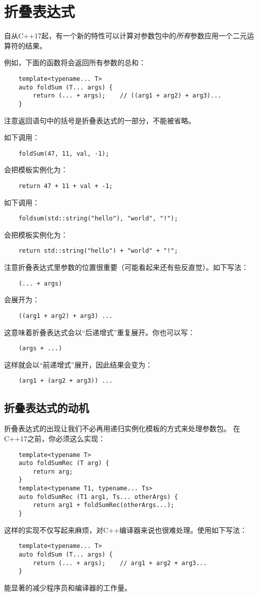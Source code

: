 \chapter{折叠表达式}\label{ch11}
自从C++17起，有一个新的特性可以计算对参数包中的\emph{所有}参数应用一个二元运算符的结果。

例如，下面的函数将会返回所有参数的总和：
\begin{lstlisting}
    template<typename... T>
    auto foldSum (T... args) {
        return (... + args);    // ((arg1 + arg2) + arg3)...
    }
\end{lstlisting}
注意返回语句中的括号是折叠表达式的一部分，不能被省略。

如下调用：
\begin{lstlisting}
    foldSum(47, 11, val, -1);
\end{lstlisting}
会把模板实例化为：
\begin{lstlisting}
    return 47 + 11 + val + -1;
\end{lstlisting}
如下调用：
\begin{lstlisting}
    foldsum(std::string("hello"), "world", "!");
\end{lstlisting}
会把模板实例化为：
\begin{lstlisting}
    return std::string("hello") + "world" + "!";
\end{lstlisting}
注意折叠表达式里参数的位置很重要（可能看起来还有些反直觉）。如下写法：
\begin{lstlisting}
    (... + args)
\end{lstlisting}
会展开为：
\begin{lstlisting}
    ((arg1 + arg2) + arg3) ...
\end{lstlisting}
这意味着折叠表达式会以“后递增式”重复展开。你也可以写：
\begin{lstlisting}
    (args + ...)
\end{lstlisting}
这样就会以“前递增式”展开，因此结果会变为：
\begin{lstlisting}
    (arg1 + (arg2 + arg3)) ...
\end{lstlisting}

\section{折叠表达式的动机}
折叠表达式的出现让我们不必再用递归实例化模板的方式来处理参数包。
在C++17之前，你必须这么实现：
\begin{lstlisting}
    template<typename T>
    auto foldSumRec (T arg) {
        return arg;
    }
    template<typename T1, typename... Ts>
    auto foldSumRec (T1 arg1, Ts... otherArgs) {
        return arg1 + foldSumRec(otherArgs...);
    }
\end{lstlisting}
这样的实现不仅写起来麻烦，对C++编译器来说也很难处理。使用如下写法：
\begin{lstlisting}
    template<typename... T>
    auto foldSum (T... args) {
        return (... + args);    // arg1 + arg2 + arg3...
    }
\end{lstlisting}
能显著的减少程序员和编译器的工作量。

